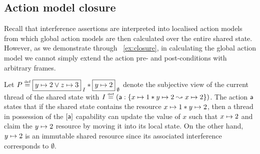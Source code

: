 \subsection{Action model closure}
\label{subsec:amodClosure}

Recall that interference assertions are interpreted into localised action models from which global action models are then calculated over the entire shared state. However, as we demonstrate through \ex~\ref{ex:closure}, in calculating the global action model we cannot simply extend the action pre- and post-conditions with arbitrary frames. 
\begin{example}[]\label{ex:closure}
Let $P \eqdef \shared{\cell{y}{2} \lor \cell{z}{3}}{I} * \shared{\cell{y}{2}}{\emptyset}$ denote the subjective view of the current thread of the shared state with $I \mathrel{\stackrel{\smash{\scriptscriptstyle{\mathrm{def}}}}{=}} (\mathsf{a}: \left\{x \mapsto 1 * y \mapsto 2 \mathrel{\leadsto} x \mapsto 2\right\})$. The action $\mathsf{a}$ states that if the shared state contains the resource $x \mapsto 1 * y \mapsto 2$, then a thread in possession of the $[\mathsf{a}]$ capability can update the value of $x$ such that $x \mapsto 2$ and claim the $y \mapsto 2$ resource by moving it into its local state. On the other hand, $y \mapsto 2$ is an immutable shared resource since its associated interference corresponds to $\emptyset$.


\end{example}
